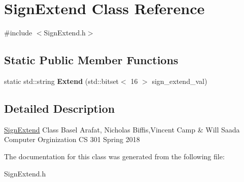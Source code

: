 \hypertarget{class_sign_extend}{}\section{Sign\+Extend Class Reference}
\label{class_sign_extend}


{\ttfamily \#include $<$Sign\+Extend.\+h$>$}

\subsection*{Static Public Member Functions}
\begin{DoxyCompactItemize}
\item 
\mbox{\label{class_sign_extend_a0636bbd05631fc9d73012bd6d78107ea}} 
static std\+::string {\bfseries Extend} (std\+::bitset$<$ 16 $>$ sign\+\_\+extend\+\_\+val)
\end{DoxyCompactItemize}


\subsection{Detailed Description}
\mbox{\hyperlink{class_sign_extend}{Sign\+Extend}} Class Basel Arafat, Nicholas Biffis,Vincent Camp \& Will Saada Computer Orginization CS 301 Spring 2018 

The documentation for this class was generated from the following file\+:\begin{DoxyCompactItemize}
\item 
Sign\+Extend.\+h\end{DoxyCompactItemize}
